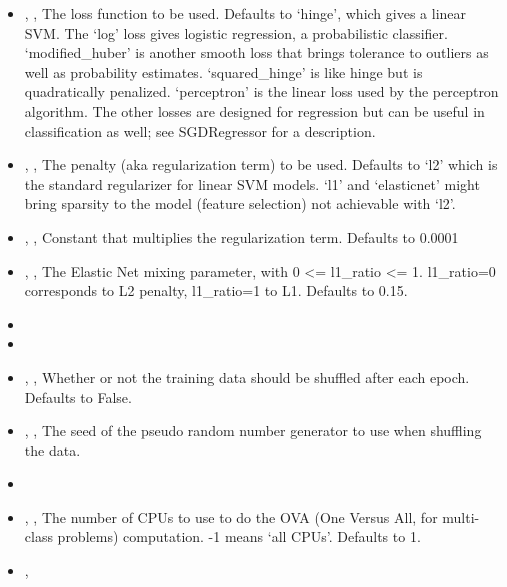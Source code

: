 \begin{itemize}
  \item {} , ,
  The loss function to be used.
  Defaults to ‘hinge’, which gives a linear SVM.
  The ‘log’ loss gives logistic regression, a probabilistic classifier.
  ‘modified\_huber’ is another smooth loss that brings
  tolerance to outliers as well as probability estimates.
  ‘squared\_hinge’ is like hinge but is quadratically
  penalized.
  ‘perceptron’ is the linear loss used by the perceptron algorithm.
  The other losses are designed for regression but can be useful in
  classification as well; see SGDRegressor for a description.
  \item {} , ,
  The penalty (aka regularization term) to be used.
  Defaults to ‘l2’ which is the standard regularizer for linear SVM models.
  ‘l1’ and ‘elasticnet’ might bring sparsity to the model (feature
  selection) not achievable with ‘l2’.
  \item {} , ,
  Constant that multiplies the regularization term.
  Defaults to 0.0001
  \item {} , ,
  The Elastic Net mixing parameter, with 0 <= l1\_ratio <= 1.
  l1\_ratio=0 corresponds to L2 penalty, l1\_ratio=1
  to L1.
  Defaults to 0.15.
  \item {}
  \item {}
  \item {} , ,
  Whether or not the training data should be shuffled after each epoch.
  Defaults to False.
  \item {} , ,
  The seed of the pseudo random number generator to use when shuffling the data.
  \item \verDescriptionB
  \item {} , ,
  The number of CPUs to use to do the OVA (One Versus All, for multi-class
  problems) computation.
  -1 means ‘all CPUs’.
  Defaults to 1.
  \item {} , 
\end{itemize}
